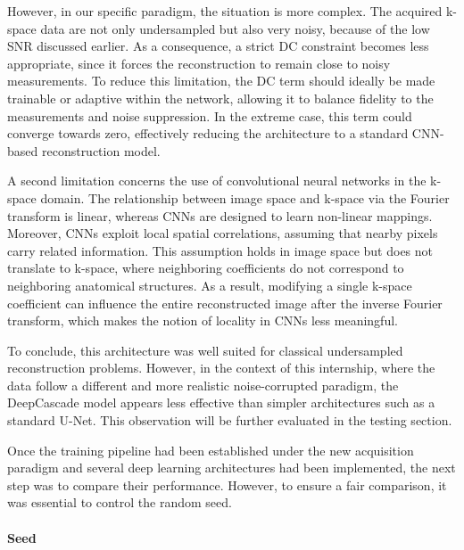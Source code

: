 \documentclass[12pt]{article}
\begin{document}
However, in our specific paradigm, the situation is more complex. 
The acquired k-space data are not only undersampled but also very noisy, because of the low SNR discussed earlier.
As a consequence, a strict DC constraint becomes less appropriate, since it forces the reconstruction to remain close to noisy measurements. 
To reduce this limitation, the DC term should ideally be made trainable or adaptive within the network, allowing it to balance fidelity to the measurements and noise suppression. 
In the extreme case, this term could converge towards zero, effectively reducing the architecture to a standard CNN-based reconstruction model.
\vspace{0.5cm}

A second limitation concerns the use of convolutional neural networks in the k-space domain. 
The relationship between image space and k-space via the Fourier transform is linear, whereas CNNs are designed to learn non-linear mappings.
Moreover, CNNs exploit local spatial correlations, assuming that nearby pixels carry related information. 
This assumption holds in image space but does not translate to k-space, where neighboring coefficients do not correspond to neighboring anatomical structures. 
As a result, modifying a single k-space coefficient can influence the entire reconstructed image after the inverse Fourier transform, which makes the notion of locality in CNNs less meaningful.

\vspace{0.5cm}
To conclude, this architecture was well suited for classical undersampled reconstruction problems. 
However, in the context of this internship, where the data follow a different and more realistic noise-corrupted paradigm, the DeepCascade model appears less effective than simpler architectures such as a standard U-Net.
This observation will be further evaluated in the testing section.

\vspace{0.5cm}
Once the training pipeline had been established under the new acquisition paradigm and several deep learning architectures had been implemented, the next step was to compare their performance. 
However, to ensure a fair comparison, it was essential to control the random seed.

\paragraph{Seed}
\mbox{}\\
\end{document}
